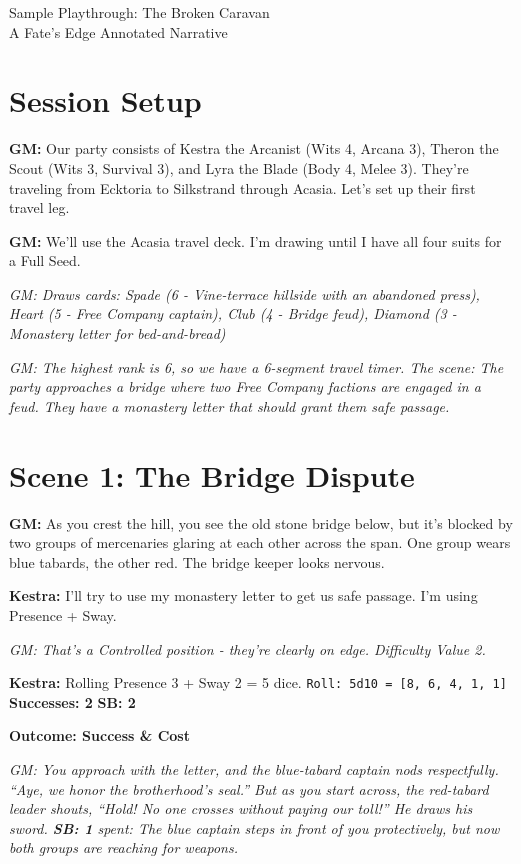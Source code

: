 \documentclass[11pt]{article}
\newcommand{\player}[1]{\textbf{#1:}}
\newcommand{\gm}[1]{\textit{GM: #1}}
\newcommand{\roll}[2]{\texttt{Roll: #1d10 = [#2]}}
\newcommand{\success}[1]{\textbf{Successes: #1}}
\newcommand{\cp}[1]{\textbf{SB: #1}}
\newcommand{\outcome}[1]{\textbf{Outcome: #1}}
\begin{document}
\begin{center}
{\LARGE Sample Playthrough: The Broken Caravan}\\
\vspace{0.5em}
{\large A Fate's Edge Annotated Narrative}
\end{center}

\section*{Session Setup}

\player{GM} Our party consists of Kestra the Arcanist (Wits 4, Arcana 3), Theron the Scout (Wits 3, Survival 3), and Lyra the Blade (Body 4, Melee 3). They're traveling from Ecktoria to Silkstrand through Acasia. Let's set up their first travel leg.

\player{GM} We'll use the Acasia travel deck. I'm drawing until I have all four suits for a Full Seed.

\gm{Draws cards: Spade (6 - Vine-terrace hillside with an abandoned press), Heart (5 - Free Company captain), Club (4 - Bridge feud), Diamond (3 - Monastery letter for bed-and-bread)}

\gm{The highest rank is 6, so we have a 6-segment travel timer. The scene: The party approaches a bridge where two Free Company factions are engaged in a feud. They have a monastery letter that should grant them safe passage.}

\section*{Scene 1: The Bridge Dispute}

\player{GM} As you crest the hill, you see the old stone bridge below, but it's blocked by two groups of mercenaries glaring at each other across the span. One group wears blue tabards, the other red. The bridge keeper looks nervous.

\player{Kestra} I'll try to use my monastery letter to get us safe passage. I'm using Presence + Sway.

\gm{That's a Controlled position - they're clearly on edge. Difficulty Value 2.}

\player{Kestra} Rolling Presence 3 + Sway 2 = 5 dice. \roll{5}{8, 6, 4, 1, 1} \success{2} \cp{2}

\outcome{Success \& Cost}

\gm{You approach with the letter, and the blue-tabard captain nods respectfully. ``Aye, we honor the brotherhood's seal.'' But as you start across, the red-tabard leader shouts, ``Hold! No one crosses without paying our toll!'' He draws his sword. \cp{1} spent: The blue captain steps in front of you protectively, but now both groups are reaching for weapons.}
\end{document}
